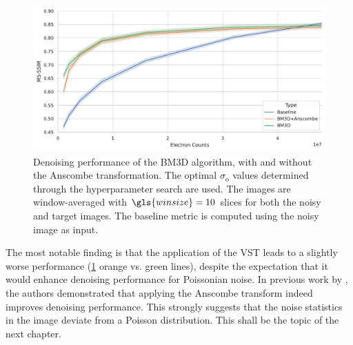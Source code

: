 \begin{figure}
    \centering
    \includegraphics[width=1\linewidth]{images/bm3d_msssim.pdf}
    \caption{Denoising performance of the \gls{BM3D} algorithm, with and without the Anscombe transformation. The optimal $\sigma_{\text{o}}$ values determined through the hyperparameter search are used. The images are window-averaged with $\gls{winsize}=10$ slices for both the noisy and target images. The baseline metric is computed using the noisy image as input.}
    \label{fig:bm3d-msssim}
\end{figure}


The most notable finding is that the application of the \gls{VST} leads to a slightly worse performance (\cref{fig:bm3d-msssim} orange vs. green lines), despite the expectation that it would enhance denoising performance for Poissonian noise. In previous work by \citeauthor{makitaloOptimalInversionAnscombe2011}, the authors demonstrated that applying the Anscombe transform indeed improves denoising performance. This strongly suggests that the noise statistics in the image deviate from a Poisson distribution. This shall be the topic of the next chapter. 
